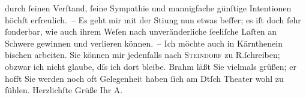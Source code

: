 \begin{ledgroupsized}[t]{13cm}
               durch ſeinen Verſtand, ſeine Sympathie und mannigfache {\pb}günſtige Intentionen höchſt erfreulich. –\pend
           \pstart
           Es geht mir mit der Sti{\geminationm}ung nun etwas beſſer; es iſt
               doch ſehr ſonderbar, wie auch \strikeout{\textcolor{gray}{ganz feſtſtehende}} ihrem Weſen nach unveränderliche ſeeliſche Laſten an Schwere gewinnen und
               verlieren können. – Ich möchte auch in Kärnthenein bischen arbeiten. Sie können mir jedenfalls nach \textsc{Steindorf} zu R.ſchreiben; obzwar ich nicht glaube, dſs ich dort
               bleibe.\pend
           \pstart
           Brahm läßt Sie vielmals grüßen; er hofft Sie
               werden noch oft Gelegenhei\textcolor{gray}{t} haben ſich am Dtſch Theater wohl zu fühlen.\pend
           \pstart Herzlichſte Grüße Ihr \spacefill\mbox{A.}\pend{}
         
         \endnumbering{}\end{ledgroupsized}  \newcommand{\dateiname}{L00802}\newcommand{\titel}{Arthur Schnitzler an Hugo von Hofmannsthal, [4. 6. 1898]}\newcommand{\editorInnen}{Martin Anton Müller und Gerd-Hermann Susen}
      
